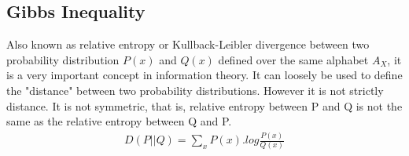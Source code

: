 \documentclass[10pt,twocolumn,letterpaper]{article}
\begin{document}
\subsection{Gibbs Inequality}
Also known as relative entropy or Kullback-Leibler divergence between two probability distribution $P(x)$ and $Q(x)$ defined over the same alphabet $A_X$, it is a very important concept in information theory. It can loosely be used to define the "distance" between two probability distributions. However it is not strictly distance. It is not symmetric, that is, relative entropy between P and Q is not the same as the relative entropy between Q and P.
\begin{eqnarray*}
    D(P||Q)=\sum_{x}P(x).log\frac{P(x)}{Q(x)}
\end{eqnarray*}




\end{document}
